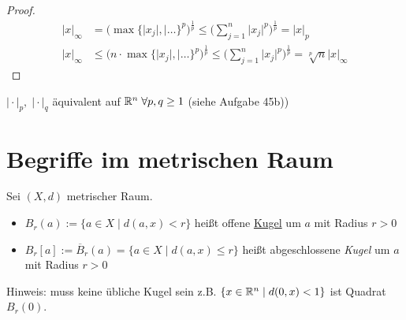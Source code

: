 \begin{proof}
    \begin{align*}
        \vert x \vert_{\infty} &=\big(\max \{ \vert x_j \vert, \vert \dots \}^p\big)^\frac{1}{p} \leq \bigg(\sum_{j=1}^{n} \vert x_j \vert^p \bigg)^\frac{1}{p} = \vert x \vert_p\\
        \vert x \vert_{\infty} &\leq \big( n\cdot \max\{ \vert x_j \vert, \vert \dots \}^p\big)^\frac{1}{p} \leq \bigg(\sum_{j=1}^{n} \vert x_j \vert^p \bigg)^\frac{1}{p} = \sqrt[p]{n}\vert x \vert_{\infty}
    \end{align*}\QEDA
\end{proof}

\begin{folg}
    $\vert \cdot \vert_p,\;\vert \cdot \vert_q$ äquivalent auf $\mathbb{R}^n\;\forall p,q \geq 1$ (siehe Aufgabe 45b))
\end{folg}

\section{Begriffe im metrischen Raum}

\begin{mydefn}
    Sei $(X,d)$ metrischer Raum.
    \begin{itemize}
    \item $B_r(a):= \{ a \in X \mid d(a,x) <r \}$ heißt offene \underline{Kugel} um $a$ mit Radius $r>0$
    \item $B_r[a]:= \overline{B}_r(a) = \{ a \in X \mid d(a,x) \leq r \}$ heißt abgeschlossene \emph{Kugel} um $a$ mit Radius $r>0$
    \end{itemize}
\end{mydefn}
Hinweis: muss keine übliche Kugel sein z.B. $\{x\in \mathbb{R}^n \mid d(0,x) < 1\}$ ist Quadrat $B_r(0)$.

